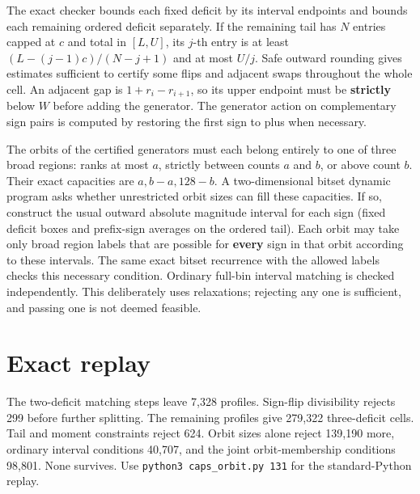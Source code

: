 \documentclass[11pt,letterpaper]{article}
\begin{document}
The exact checker bounds each fixed deficit by its interval endpoints
and bounds each remaining ordered deficit separately. If the remaining
tail has \(N\) entries capped at \(c\) and total in \([L,U]\), its
\(j\)-th entry is at least \((L-(j-1)c)/(N-j+1)\) and at most \(U/j\).
Safe outward rounding gives estimates sufficient to certify some flips
and adjacent swaps throughout the whole cell. An adjacent gap is
\(1+r_i-r_{i+1}\), so its upper endpoint must be \textbf{strictly} below
\(W\) before adding the generator. The generator action on complementary
sign pairs is computed by restoring the first sign to plus when
necessary.

The orbits of the certified generators must each belong entirely to one
of three broad regions: ranks at most \(a\), strictly between counts
\(a\) and \(b\), or above count \(b\). Their exact capacities are
\(a,b-a,128-b\). A two-dimensional bitset dynamic program asks whether
unrestricted orbit sizes can fill these capacities. If so, construct the
usual outward absolute magnitude interval for each sign (fixed deficit
boxes and prefix-sign averages on the ordered tail). Each orbit may take
only broad region labels that are possible for \textbf{every} sign in
that orbit according to these intervals. The same exact bitset
recurrence with the allowed labels checks this necessary condition.
Ordinary full-bin interval matching is checked independently. This
deliberately uses relaxations; rejecting any one is sufficient, and
passing one is not deemed feasible.


\section{Exact replay}
The two-deficit matching steps leave 7,328 profiles. Sign-flip divisibility
rejects 299 before further splitting. The remaining profiles give 279,322
three-deficit cells. Tail and moment constraints reject 624. Orbit sizes
alone reject 139,190 more, ordinary interval conditions 40,707, and the
joint orbit-membership conditions 98,801. None survives.
Use \texttt{python3 caps\_orbit.py 131} for the standard-Python replay.
\end{document}
